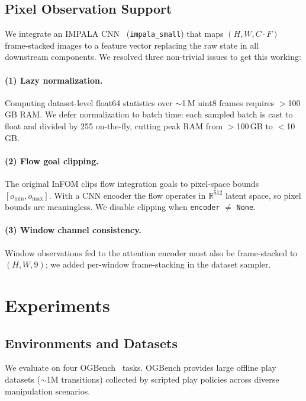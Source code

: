 \documentclass{article}
\newcommand{\base}{InFOM}
\begin{document}
\subsection{Pixel Observation Support}
\label{sec:visual}

We integrate an IMPALA CNN~\cite{espeholt2018impala}
(\texttt{impala\_small}) that maps
$(H,W,C{\cdot}F)$ frame-stacked images to a feature vector
replacing the raw state in all downstream components.
We resolved three non-trivial issues to get this working:

\paragraph{(1) Lazy normalization.}
Computing dataset-level float64 statistics over $\sim$1\,M
uint8 frames requires $>$100\,GB RAM.
We defer normalization to batch time: each sampled batch is
cast to float and divided by 255 on-the-fly, cutting peak
RAM from $>$100\,GB to $<$10\,GB.

\paragraph{(2) Flow goal clipping.}
The original \base{} clips flow integration goals to
pixel-space bounds $[o_{\mathrm{min}},o_{\mathrm{max}}]$.
With a CNN encoder the flow operates in $\mathbb{R}^{512}$
latent space, so pixel bounds are meaningless.
We disable clipping when \texttt{encoder} $\neq$ \texttt{None}.

\paragraph{(3) Window channel consistency.}
Window observations fed to the attention encoder must also
be frame-stacked to $(H,W,9)$; we added per-window
frame-stacking in the dataset sampler.

\section{Experiments}
\label{sec:experiments}

\subsection{Environments and Datasets}
\label{sec:envs}

We evaluate on four OGBench~\cite{park2025ogbench} tasks.
OGBench provides large offline play datasets ($\sim$1M transitions)
collected by scripted play policies across diverse manipulation
scenarios.
\end{document}
